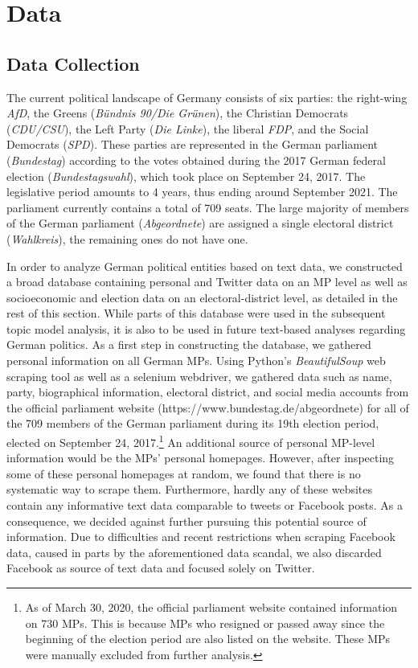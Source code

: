 \section{Data}

\subsection{Data Collection}

The current political landscape of Germany consists of six parties: the right-wing \textit{AfD}, the Greens (\textit{Bündnis 90/Die Grünen}), the Christian Democrats (\textit{CDU/CSU}), the Left Party (\textit{Die Linke}), the liberal \textit{FDP}, and the Social Democrats (\textit{SPD}). These parties are represented in the German parliament (\textit{Bundestag}) according to the votes obtained during the 2017 German federal election (\textit{Bundestagswahl}), which took place on September 24, 2017. The legislative period amounts to 4 years, thus ending around September 2021. The parliament currently contains a total of 709 seats. The large majority of members of the German parliament (\textit{Abgeordnete}) are assigned a single electoral district (\textit{Wahlkreis}), the remaining ones do not have one.

In order to analyze German political entities based on text data, we constructed a broad database containing personal and Twitter data on an MP level as well as socioeconomic and election data on an electoral-district level, as detailed in the rest of this section. While parts of this database were used in the subsequent topic model analysis, it is also to be used in future text-based analyses regarding German politics. As a first step in constructing the database, we gathered personal information on all German MPs. Using Python's \textit{BeautifulSoup} web scraping tool as well as a selenium webdriver, we gathered data such as name, party, biographical information, electoral district, and social media accounts from the official parliament website (https://www.bundestag.de/abgeordnete) for all of the 709 members of the German parliament during its 19th election period, elected on September 24, 2017.\footnote{As of March 30, 2020, the official parliament website contained information on 730 MPs. This is because MPs who resigned or passed away since the beginning of the election period are also listed on the website. These MPs were manually excluded from further analysis.} An additional source of personal MP-level information would be the MPs' personal homepages. However, after inspecting some of these personal homepages at random, we found that there is no systematic way to scrape them. Furthermore, hardly any of these websites contain any informative text data comparable to tweets or Facebook posts. As a consequence, we decided against further pursuing this potential source of information. Due to difficulties and recent restrictions when scraping Facebook data, caused in parts by the aforementioned data scandal, we also discarded Facebook as source of text data and focused solely on Twitter. 

